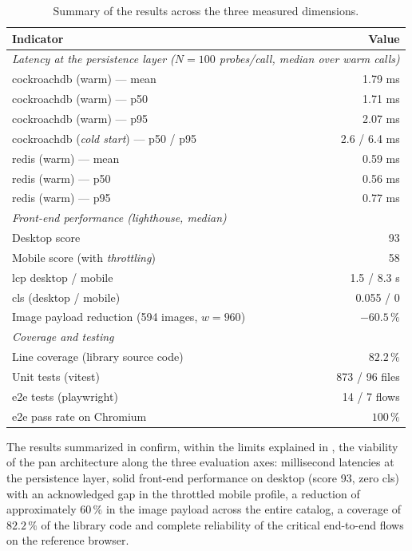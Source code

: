 \begin{table}[htbp]
\centering
\caption{Summary of the results across the three measured dimensions.}
\label{tab:rezultate}
\begin{tabular}{lr}
\toprule
\textbf{Indicator} & \textbf{Value} \\
\midrule
\multicolumn{2}{l}{\textit{Latency at the persistence layer (\(N=100\) probes/call, median over warm calls)}} \\
\quad \gls{cockroachdb} (warm) --- mean & 1.79 ms \\
\quad \gls{cockroachdb} (warm) --- \acrshort{p50} & 1.71 ms \\
\quad \gls{cockroachdb} (warm) --- \acrshort{p95} & 2.07 ms \\
\quad \gls{cockroachdb} (\textit{cold start}) --- \acrshort{p50} / \acrshort{p95} & 2.6 / 6.4 ms \\
\quad \gls{redis} (warm) --- mean & 0.59 ms \\
\quad \gls{redis} (warm) --- \acrshort{p50} & 0.56 ms \\
\quad \gls{redis} (warm) --- \acrshort{p95} & 0.77 ms \\
\midrule
\multicolumn{2}{l}{\textit{Front-end performance (\gls{lighthouse}, median)}} \\
\quad Desktop score & 93 \\
\quad Mobile score (with \textit{throttling}) & 58 \\
\quad \acrshort{lcp} desktop / mobile & 1.5 / 8.3 s \\
\quad \acrshort{cls} (desktop / mobile) & 0.055 / 0 \\
\quad Image payload reduction (594 images, \(w=960\)) & \(-60.5\,\%\) \\
\midrule
\multicolumn{2}{l}{\textit{Coverage and testing}} \\
\quad Line coverage (library source code) & \(82.2\,\%\) \\
\quad Unit tests (\gls{vitest}) & 873 / 96 files \\
\quad \acrshort{e2e} tests (\gls{playwright}) & 14 / 7 flows \\
\quad \acrshort{e2e} pass rate on Chromium & \(100\,\%\) \\
\bottomrule
\end{tabular}
\end{table}

The results summarized in  confirm, within the limits explained in , the viability of the \gls{pan} architecture along the three evaluation axes: millisecond latencies at the persistence layer, solid front-end performance on desktop (score 93, zero \gls{cls}) with an acknowledged gap in the throttled mobile profile, a reduction of approximately \(60\,\%\) in the image payload across the entire catalog, a coverage of \(82.2\,\%\) of the library code and complete reliability of the critical end-to-end flows on the reference browser.

